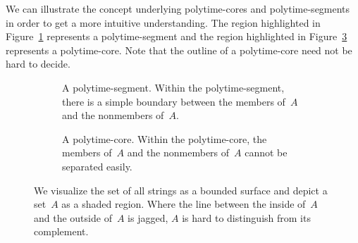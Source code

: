 \begin{example}
  We can illustrate the concept underlying polytime-cores and polytime-segments in order to get a more intuitive understanding.
  The region highlighted in Figure~\ref{fig:segmentcore:segment} represents a polytime-segment and the region highlighted in Figure~\ref{fig:segmentcore:core} represents a polytime-core.
  Note that the outline of a polytime-core need not be hard to decide.
  \begin{figure}
    \centering
    \begin{subfigure}{0.4\textwidth}
      \centering
      \caption{
        A polytime-segment.
        Within the polytime-segment, there is a simple boundary between the members of~$A$ and the nonmembers of~$A$.
      }
      \label{fig:segmentcore:segment}
    \end{subfigure}
    \qquad
    \begin{subfigure}{0.4\textwidth}
      \centering
      \caption{
        A polytime-core.
        Within the polytime-core, the members of~$A$ and the nonmembers of~$A$ cannot be separated easily.
      }
      \label{fig:segmentcore:core}
    \end{subfigure}
    \caption{
      We visualize the set of all strings as a bounded surface and depict a set~$A$ as a shaded region.
      Where the line between the inside of~$A$ and the outside of~$A$ is jagged, $A$ is hard to distinguish from its complement.
    }
  \end{figure}
\end{example}

